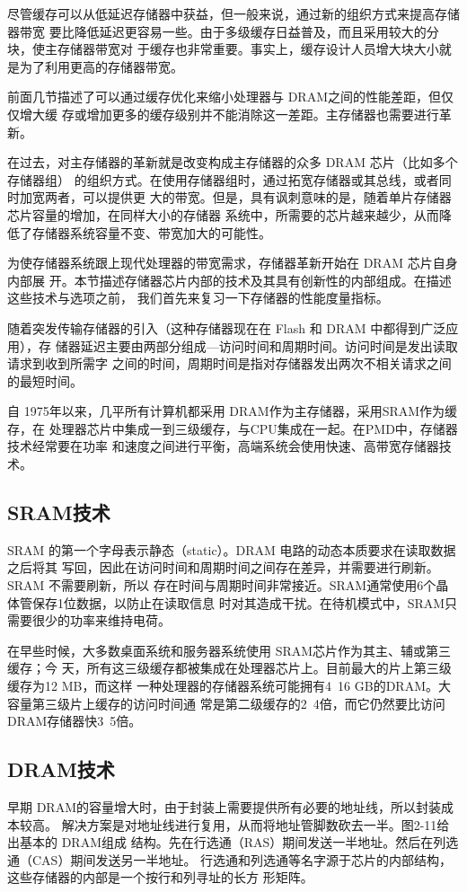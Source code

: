 尽管缓存可以从低延迟存储器中获益，但一般来说，通过新的组织方式来提高存储器带宽
要比降低延迟更容易一些。由于多级缓存日益普及，而且采用较大的分块，使主存储器带宽对
于缓存也非常重要。事实上，缓存设计人员增大块大小就是为了利用更高的存储器带宽。

前面几节描述了可以通过缓存优化来缩小处理器与 DRAM之间的性能差距，但仅仅增大缓
存或增加更多的缓存级别并不能消除这一差距。主存储器也需要进行革新。

在过去，对主存储器的革新就是改变构成主存储器的众多 DRAM 芯片（比如多个存储器组）
的组织方式。在使用存储器组时，通过拓宽存储器或其总线，或者同时加宽两者，可以提供更
大的带宽。但是，具有讽刺意味的是，随着单片存储器芯片容量的增加，在同样大小的存储器
系统中，所需要的芯片越来越少，从而降低了存储器系统容量不变、带宽加大的可能性。

为使存储器系统跟上现代处理器的带宽需求，存储器革新开始在 DRAM 芯片自身内部展
开。本节描述存储器芯片内部的技术及其具有创新性的内部组成。在描述这些技术与选项之前，
我们首先来复习一下存储器的性能度量指标。

随着突发传输存储器的引入（这种存储器现在在 Flash 和 DRAM 中都得到广泛应用），存
储器延迟主要由两部分组成—访问时间和周期时间。访问时间是发出读取请求到收到所需字
之间的时间，周期时间是指对存储器发出两次不相关请求之间的最短时间。

自 1975年以来，几平所有计算机都采用 DRAM作为主存储器，采用SRAM作为缓存，在
处理器芯片中集成一到三级缓存，与CPU集成在一起。在PMD中，存储器技术经常要在功率
和速度之间进行平衡，高端系统会使用快速、高带宽存储器技术。

\subsection{SRAM技术}
SRAM 的第一个字母表示静态（static）。DRAM 电路的动态本质要求在读取数据之后将其
写回，因此在访问时间和周期时间之间存在差异，并需要进行刷新。SRAM 不需要刷新，所以
存在时间与周期时间非常接近。SRAM通常使用6个晶体管保存1位数据，以防止在读取信息
时对其造成干扰。在待机模式中，SRAM只需要很少的功率来维持电荷。

在早些时候，大多数桌面系统和服务器系统使用 SRAM芯片作为其主、辅或第三缓存；今
天，所有这三级缓存都被集成在处理器芯片上。目前最大的片上第三级缓存为12 MB，而这样
一种处理器的存储器系统可能拥有4~16 GB的DRAM。大容量第三级片上缓存的访问时间通
常是第二级缓存的2~4倍，而它仍然要比访问 DRAM存储器快3~5倍。
\subsection{DRAM技术}
早期 DRAM的容量增大时，由于封装上需要提供所有必要的地址线，所以封装成本较高。
解决方案是对地址线进行复用，从而将地址管脚数砍去一半。图2-11给出基本的 DRAM组成
结构。先在行选通（RAS）期间发送一半地址。然后在列选通（CAS）期间发送另一半地址。
行选通和列选通等名字源于芯片的内部结构，这些存储器的内部是一个按行和列寻址的长方
形矩阵。

